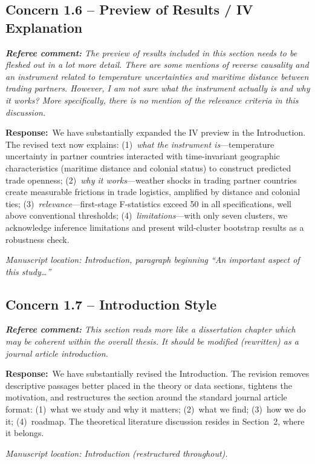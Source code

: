 \documentclass[11pt]{article}
\newcommand{\RC}[1]{\begin{refereebox}\textit{\textbf{Referee comment:} #1}\end{refereebox}}
\newcommand{\AR}{\noindent\textbf{Response:}\ }
\begin{document}
\subsection*{Concern 1.6 -- Preview of Results / IV Explanation}

\RC{The preview of results included in this section needs to be fleshed out in a lot more detail. There are some mentions of reverse causality and an instrument related to temperature uncertainties and maritime distance between trading partners. However, I am not sure what the instrument actually is and why it works? More specifically, there is no mention of the relevance criteria in this discussion.}

\AR We have substantially expanded the IV preview in the Introduction. The revised text now explains: (1)~\emph{what the instrument is}---temperature uncertainty in partner countries interacted with time-invariant geographic characteristics (maritime distance and colonial status) to construct predicted trade openness; (2)~\emph{why it works}---weather shocks in trading partner countries create measurable frictions in trade logistics, amplified by distance and colonial ties; (3)~\emph{relevance}---first-stage F-statistics exceed 50 in all specifications, well above conventional thresholds; (4)~\emph{limitations}---with only seven clusters, we acknowledge inference limitations and present wild-cluster bootstrap results as a robustness check.

\smallskip\noindent\textit{Manuscript location: Introduction, paragraph beginning ``An important aspect of this study\ldots''}

\subsection*{Concern 1.7 -- Introduction Style}

\RC{This section reads more like a dissertation chapter which may be coherent within the overall thesis. It should be modified (rewritten) as a journal article introduction.}

\AR We have substantially revised the Introduction. The revision removes descriptive passages better placed in the theory or data sections, tightens the motivation, and restructures the section around the standard journal article format: (1)~what we study and why it matters; (2)~what we find; (3)~how we do it; (4)~roadmap. The theoretical literature discussion resides in Section~2, where it belongs.

\smallskip\noindent\textit{Manuscript location: Introduction (restructured throughout).}
\end{document}
